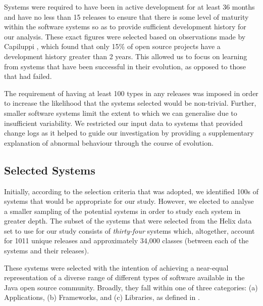 Systems were required to have been in active development for at least 36 months and have no less than 15 releases to ensure that there is some level of maturity within the software systems so as to provide sufficient development history for our analysis. These exact figures were selected based on observations made by Capiluppi \cite{Capiluppi03a}, which found that only 15\% of open source projects have a development history greater than 2 years. This allowed us to focus on learning from systems that have been successful in their evolution, as opposed to those that had failed.

The requirement of having at least 100 types in any releases was imposed in order to increase the likelihood that the systems selected would be non-trivial. Further, smaller software systems limit the extent to which we can generalise due to insufficient variability. We restricted our input data to systems that provided change logs as it helped to guide our investigation by providing a supplementary explanation of abnormal behaviour through the course of evolution.



\subsection{Selected Systems} %
\label{sub:selected_systems}

Initially, according to the selection criteria that was adopted, we identified 100s of systems that would be appropriate for our study. However, we elected to analyse a smaller sampling of the potential systems in order to study each system in greater depth. The subset of the systems that were selected from the Helix data set to use for our study consists of \emph{thirty-four} systems which, altogether, account for 1011 unique releases and approximately 34,000 classes (between each of the systems and their releases).

These systems were selected with the intention of achieving a near-equal representation of a diverse range of different types of software available in the Java open source community. Broadly, they fall within one of three categories: (a) Applications, (b) Frameworks, and (c) Libraries, as defined in \cite{Vasa10a}.

